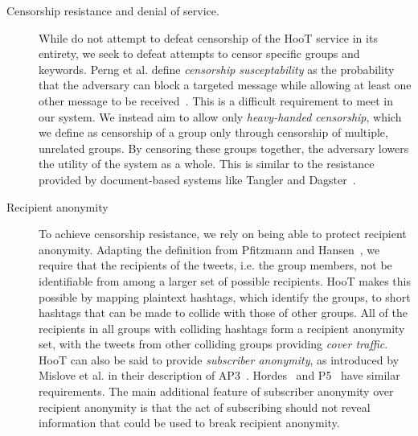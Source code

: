 \begin{description}
\item[Censorship resistance and denial of service.] While do not attempt
  to defeat censorship of the HooT service in its entirety, we seek to
  defeat attempts to censor specific groups and keywords. Perng et
  al. define {\em censorship susceptability} as the probability that the
  adversary can block a targeted message while allowing at least one
  other message to be received~\cite{perng05revisited}. This is a
  difficult requirement to meet in our system. We instead aim to allow
  only {\em heavy-handed censorship}, which we define as censorship of a
  group only through censorship of multiple, unrelated groups. By
  censoring these groups together, the adversary lowers the utility of
  the system as a whole. This is similar to the resistance provided by
  document-based systems like Tangler and Dagster~\cite{tangler,
    dagster}.

\item[Recipient anonymity] To achieve censorship resistance, we rely on
  being able to protect recipient anonymity. Adapting the definition
  from Pfitzmann and Hansen~\cite{terminology}, we require that the
  recipients of the tweets, i.e. the group members, not be identifiable
  from among a larger set of possible recipients. HooT makes this
  possible by mapping plaintext hashtags, which identify the groups, to
  short hashtags that can be made to collide with those of other
  groups. All of the recipients in all groups with colliding hashtags
  form a recipient anonymity set, with the tweets from other colliding
  groups providing {\em cover traffic}. HooT can also be said to provide
  {\em subscriber anonymity}, as introduced by Mislove et al. in their
  description of AP3~\cite{ap3}. Hordes~\cite{hordes} and P5~\cite{P5}
  have similar requirements. The main additional feature of subscriber
  anonymity over recipient anonymity is that the act of subscribing
  should not reveal information that could be used to break recipient
  anonymity.



\end{description}
